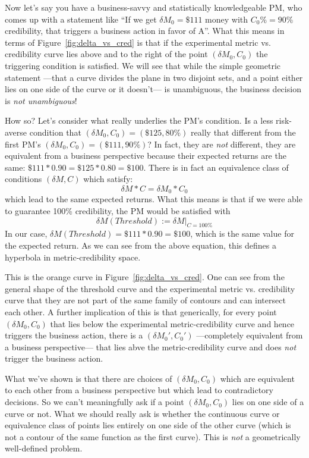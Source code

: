 \documentclass[letterpaper,12pt]{article}
\newcommand{\beq}{\begin{equation}} %
\newcommand{\eeq}{\end{equation}} %
\begin{document}
Now let's say you have a business-savvy and statistically
knowledgeable PM, who comes up with a statement like ``If we get
\(\delta M_0 = \$111\) money with \(C_0\% = 90\%\) credibility, that
triggers a business action in favor of A''.  What this means in terms
of Figure~\ref{fig:delta_vs_cred} is that if the experimental metric
vs. credibility curve lies above and to the right of the point
\((\delta M_0, C_0)\) the triggering condition is satisfied.  We will
see that while the simple geometric statement ---that a curve divides
the plane in two disjoint sets, and a point either lies on one side of
the curve or it doesn't--- is unambiguous, the business decision is
{\em not unambiguous}!

How so? Let's consider what really underlies the PM's condition.
Is a less risk-averse
condition that \((\delta M_0, C_0) = (\$125, 80\%)\) really that
different from the first PM's \((\delta M_0, C_0) = (\$111, 90\%)\)?
In fact, they are {\em not} different, they are equivalent from a
business perspective because their expected returns are the same:
\(\$111* 0.90 = \$125* 0.80 = \$100\). There is in fact an equivalence class
of conditions \((\delta M, C)\) which satisfy:
\beq\label{eq:hyperbola}
\delta M*C =\delta M_0*C_0
\eeq
which lead to the same expected returns.  What this means is that if
we were able to guarantee 100\% credibility, the PM would be satisfied
with
\beq
\delta M(Threshold):=\delta M|_{C=100\%}
\eeq
In our case, \(\delta M(Threshold) =\$111*0.90=\$100\), which is the
same value for the expected return. As we can see from the above
equation, this defines a hyperbola in metric-credibility space.

This is the orange curve in Figure~\ref{fig:delta_vs_cred}. One can
see from the general shape of the threshold curve and the experimental
metric vs. credibility curve that they are not part of the same family of
contours and can intersect each other. A further implication of this
is that generically, for every point \((\delta M_0, C_0)\) that lies
below the experimental metric-credibility curve and hence triggers the
business action, there is a \((\delta M_0', C_0')\) ---completely
equivalent from a business perspective--- that lies abve the
metric-credibility curve and does {\em not} trigger the business
action.

What we've shown is that there are choices of \((\delta M_0, C_0)\)
which are equivalent to each other from a business perspective but
which lead to contradictory decisions. So we can't meaningfully ask if
a point \((\delta M_0, C_0)\) lies on one side of a curve or not. What
we should really ask is whether the continuous curve or equivalence
class of points lies entirely on one side of the other curve (which is
not a contour of the same function as the first curve). This is {\em
  not} a geometrically well-defined problem.
\end{document}
